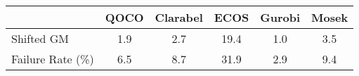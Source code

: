 \begin{tabular}{lccccc}
  \hline
   & \textbf{QOCO} & \textbf{Clarabel} & \textbf{ECOS} & \textbf{Gurobi} & \textbf{Mosek} \\ \hline
  Shifted GM & 1.9 & 2.7 & 19.4 & 1.0 & 3.5 \\ 
  Failure Rate (\%) & 6.5 & 8.7 & 31.9 & 2.9 & 9.4 \\ \hline 
\end{tabular}
